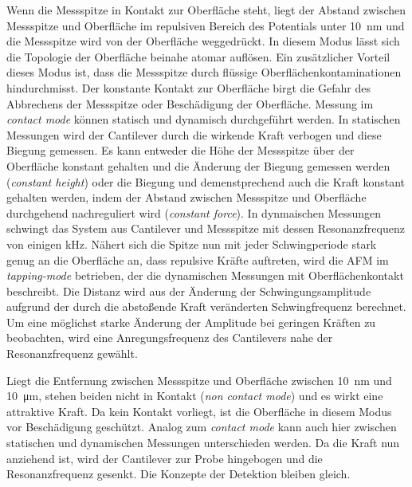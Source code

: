           Wenn die Messspitze in Kontakt zur Oberfläche steht, liegt der Abstand zwischen Messspitze und Oberfläche im repulsiven Bereich des Potentials unter \SI{10}{\nano\metre} und die Messspitze wird von 
          der Oberfläche weggedrückt. In diesem Modus lässt sich die Topologie der Oberfläche beinahe atomar auflösen. Ein zusätzlicher Vorteil dieses Modus ist, dass die Messspitze durch flüssige 
          Oberflächenkontaminationen hindurchmisst. Der konstante Kontakt zur Oberfläche birgt die Gefahr des Abbrechens der Messspitze oder Beschädigung der Oberfläche. Messung im \textit{contact mode}
          können statisch und dynamisch durchgeführt werden. In statischen Messungen wird der Cantilever durch die wirkende Kraft verbogen und diese Biegung gemessen. Es kann entweder die Höhe der Messspitze
          über der Oberfläche konstant gehalten und die Änderung der Biegung gemessen werden (\textit{constant height}) oder die Biegung  und demenstprechend auch die Kraft konstant gehalten werden, indem
          der Abstand zwischen Messspitze und Oberfläche durchgehend nachreguliert wird (\textit{constant force}). In dynmaischen Messungen schwingt das System aus Cantilever und Messspitze mit dessen 
          Resonanzfrequenz von einigen kHz. Nähert sich die Spitze nun mit jeder Schwingperiode stark genug an die Oberfläche an, dass repulsive Kräfte auftreten, wird die AFM im \textit{tapping-mode}
          betrieben, der die dynamischen Messungen mit Oberflächenkontakt beschreibt. Die Distanz wird aus der Änderung der Schwingungsamplitude aufgrund der durch die abstoßende Kraft veränderten 
          Schwingfrequenz berechnet. Um eine möglichst starke Änderung der Amplitude bei geringen Kräften zu beobachten, wird eine Anregungsfrequenz des Cantilevers nahe der Resonanzfrequenz gewählt.
          
          
          Liegt die Entfernung zwischen Messspitze und Oberfläche zwischen \SI{10}{\nano\metre} und \SI{10}{\micro\metre}, stehen beiden nicht in Kontakt (\textit{non contact mode}) und es wirkt eine 
          attraktive Kraft. Da kein Kontakt vorliegt, ist die Oberfläche in diesem Modus vor Beschädigung geschützt. Analog zum \textit{contact mode} kann auch hier zwischen statischen und dynamischen 
          Messungen unterschieden werden. Da die Kraft nun anziehend ist, wird der Cantilever zur Probe hingebogen und die Resonanzfrequenz gesenkt. Die Konzepte der Detektion bleiben gleich. 

      
      
      
      \newpage
